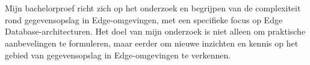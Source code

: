 
%
%
%
%
%

%



\chapter*{}

Mijn bachelorproef richt zich op het onderzoek en begrijpen van de complexiteit rond gegevensopslag in Edge-omgevingen, met een specifieke focus op Edge Database-architecturen. Het doel van mijn onderzoek is niet alleen om praktische aanbevelingen te formuleren, maar eerder om nieuwe inzichten en kennis op het gebied van gegevensopslag in Edge-omgevingen te verkennen.

